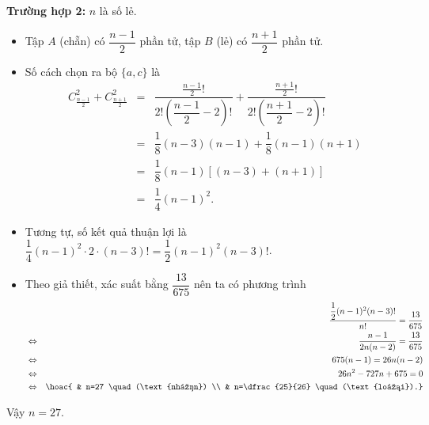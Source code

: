 \begin{ex}
{		\textbf{Trường hợp 2:} $n$ là số lẻ.
		\begin{itemize}
			\item Tập $A$ (chẵn) có $\dfrac{n-1}{2}$ phần tử, tập $B$ (lẻ) có $\dfrac{n+1}{2}$ phần tử.
			\item Số cách chọn ra bộ $\{a, c\}$ là
			\allowdisplaybreaks
			\begin{eqnarray*}
				C_{\frac{n-1}{2}}^2 + C_{\frac{n+1}{2}}^2 &=& \dfrac{\frac{n-1}{2}!}{2!\left(\dfrac{n-1}{2}-2\right)!} + \dfrac{\frac{n+1}{2}!}{2!\left(\dfrac{n+1}{2}-2\right)!} \\
				&=& \dfrac{1}{8}(n-3)(n-1) + \dfrac{1}{8}(n-1)(n+1) \\
				&=& \dfrac{1}{8}(n-1)[(n-3) + (n+1)] \\
				&=& \dfrac{1}{4}(n-1)^2.
			\end{eqnarray*}
			\item Tương tự, số kết quả thuận lợi là $\dfrac{1}{4}(n-1)^2 \cdot 2 \cdot (n-3)! = \dfrac{1}{2}(n-1)^2(n-3)!$.
			\item Theo giả thiết, xác suất bằng $\dfrac{13}{675}$ nên ta có phương trình
			\allowdisplaybreaks
			\begin{eqnarray*}
				&&\dfrac{\dfrac{1}{2}(n-1)^2(n-3)!}{n!} = \dfrac{13}{675}\\ &\Leftrightarrow& \dfrac{n-1}{2n(n-2)} = \dfrac{13}{675} \\
				&\Leftrightarrow& 675(n-1) = 26n(n-2) \\
				&\Leftrightarrow& 26n^2 - 727n + 675 = 0 \\
				&\Leftrightarrow& \hoac{ & n=27 \quad (\text{nhận}) \\ & n=\dfrac{25}{26} \quad (\text{loại}).}
			\end{eqnarray*}
		\end{itemize}
		Vậy $n=27$.
	}
\end{ex}





